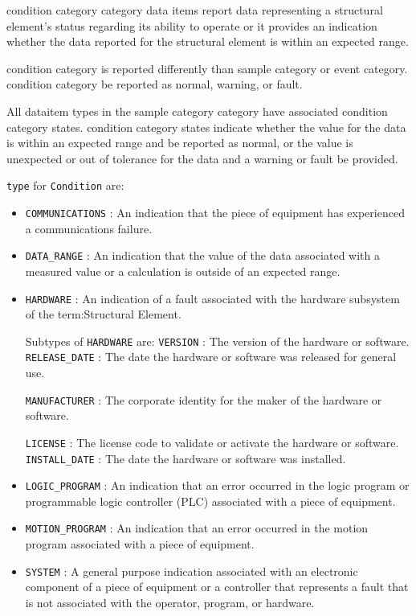 \gls{condition category} category data items report data representing a \gls{structural element}’s status regarding its ability to operate or it provides an indication whether the data reported for the \gls{structural element} is within an expected range.

\gls{condition category} is reported differently than \gls{sample category} or \gls{event category}.  \gls{condition category} \must be reported as \gls{normal}, \gls{warning}, or \gls{fault}.

All \gls{dataitem} types in the \gls{sample category} category \may have associated \gls{condition category} states.  \gls{condition category} states indicate whether the value for the data is within an expected range and \must be reported as \gls{normal}, or the value is unexpected or out of tolerance for the data and a \gls{warning} or \gls{fault} \must be provided.


 \texttt{type} for \texttt{Condition} are:
\begin{itemize}

\item \texttt{COMMUNICATIONS} : An indication that the piece of equipment has experienced a communications failure. 

\item \texttt{DATA_RANGE} : An indication that the value of the data associated with a measured value or a calculation is outside of an expected range. 

\item \texttt{HARDWARE} : An indication of a fault associated with the hardware subsystem of the {term:Structural Element}. 

Subtypes of \texttt{HARDWARE} are: 
\newline\tab \texttt{VERSION} : The version of the hardware or software. 
\newline\tab \texttt{RELEASE_DATE} : The date the hardware or software was released for general use.
 
\newline\tab \texttt{MANUFACTURER} : The corporate identity for the maker of the hardware or software.
 
\newline\tab \texttt{LICENSE} : The license code to validate or activate the hardware or software. 
\newline\tab \texttt{INSTALL_DATE} : The date the hardware or software was installed. 
\item \texttt{LOGIC_PROGRAM} : An indication that an error occurred in the logic program or programmable logic controller (PLC) associated with a piece of equipment. 

\item \texttt{MOTION_PROGRAM} : An indication that an error occurred in the motion program associated with a piece of equipment. 

\item \texttt{SYSTEM} : A general purpose indication associated with an electronic component of a piece of equipment or a controller that represents a fault that is not associated with the operator, program, or hardware. 

\end{itemize}

